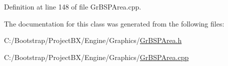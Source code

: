 Definition at line 148 of file GrBSPArea.cpp.

The documentation for this class was generated from the following files:\begin{CompactItemize}
\item 
C:/Bootstrap/ProjectBX/Engine/Graphics/\hyperlink{_gr_b_s_p_area_8h}{GrBSPArea.h}\item 
C:/Bootstrap/ProjectBX/Engine/Graphics/\hyperlink{_gr_b_s_p_area_8cpp}{GrBSPArea.cpp}\end{CompactItemize}
